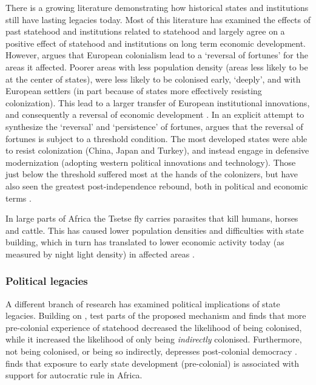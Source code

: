 There is a growing literature demonstrating how historical states and
institutions still have lasting legacies today. Most of this literature has
examined the effects of past statehood \citep{Bockstette2002, Borcan2018} and
institutions related to statehood \citep{Michalopoulos2013, Michalopoulos2018,
Englebert2000} and largely agree on a positive effect of statehood and
institutions \citep{Nunn_2020, Michalopoulos2016} on long term economic
development. However, \citet{Acemoglu_2002} argues that European colonialism
lead to a `reversal  of fortunes' for the areas it affected. Poorer areas with
less population density (areas less likely to be at the center of states), were
less likely to be colonised early, `deeply', and with European settlers (in part
because of states more effectively resisting colonization). This lead to a
larger transfer of European institutional innovations, and consequently a
reversal of economic development \citep{Acemoglu_2002}. In an explicit attempt
to synthesize the `reversal' and `persistence' of fortunes, \citep{Foa_2017}
argues that the reversal of fortunes is subject to a threshold condition.
The most developed states were able to resist colonization (China, Japan and
Turkey), and instead engage in defensive modernization (adopting western
political innovations and technology). Those just below the threshold suffered
most at the hands of the colonizers, but have also seen the greatest
post-independence rebound, both in political and economic terms \citep{Foa_2017}.


In large parts of Africa the Tsetse fly carries parasites that kill humans,
horses and cattle. This has caused lower population densities and difficulties
with state building, which in turn has translated to lower economic activity
today (as measured by night light density) in affected areas \citep{Alsan_2015}.

\subsubsection{Political legacies} \label{Political legacies}

A different branch of research has examined political implications of state
legacies. Building on \citet{Acemoglu_2002} , \citet{Hariri2012} test parts of
the proposed mechanism and finds that more pre-colonial experience of statehood
decreased the likelihood of being colonised, while it increased the likelihood
of only being \textit{indirectly} colonised. Furthermore, not being colonised,
or being so indirectly, depresses post-colonial democracy \citep{Hariri2012}.
\citet{Chlouba_2021} finds that exposure to early state development
(pre-colonial) is associated with support for autocratic rule in Africa.

